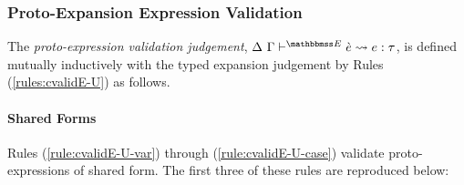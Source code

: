 \subsubsection{Proto-Expansion Expression Validation}
The \emph{proto-expression validation judgement}, $\cvalidE{\Delta}{\Gamma}{\escenev}{\ce}{e}{\tau}$, is defined mutually inductively with the typed expansion judgement by Rules (\ref*{rules:cvalidE-U}) as follows.%

\paragraph{Shared Forms} Rules (\ref{rule:cvalidE-U-var}) through (\ref{rule:cvalidE-U-case}) validate proto-expressions of shared form. The first three of these rules are reproduced below:
